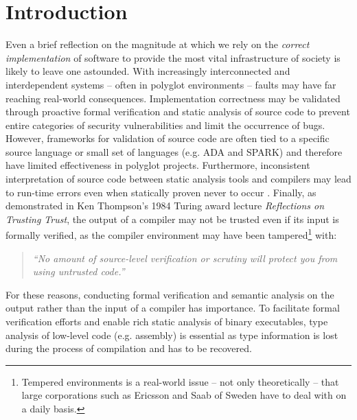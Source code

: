 
\section{Introduction}



Even a brief reflection on the magnitude at which we rely on the \textit{correct implementation} of software to provide the most vital infrastructure of society is likely to leave one astounded. With increasingly interconnected and interdependent systems -- often in polyglot environments -- faults may have far reaching real-world consequences. Implementation correctness may be validated through proactive formal verification and static analysis of source code to prevent entire categories of security vulnerabilities and limit the occurrence of bugs. However, frameworks for validation of source code are often tied to a specific source language or small set of languages (e.g. ADA and SPARK) and therefore have limited effectiveness in polyglot projects. Furthermore, inconsistent interpretation of source code between static analysis tools and compilers may lead to run-time errors even when statically proven never to occur \cite{ada_static_analysis_and_compiler_inconsistencies,wysinwyx}. Finally, as demonstrated in Ken Thompson's 1984 Turing award lecture \textit{Reflections on Trusting Trust}, the output of a compiler may not be trusted even if its input is formally verified, as the compiler environment may have been tampered\footnote{Tempered environments is a real-world issue -- not only theoretically -- that large corporations such as Ericsson and Saab of Sweden have to deal with on a daily basis.} with:

\begin{quote}
	\textit{``No amount of source-level verification or scrutiny will protect you from using untrusted code.''} \cite{trusting_trust}
\end{quote}

For these reasons, conducting formal verification and semantic analysis on the output rather than the input of a compiler has importance. To facilitate formal verification efforts and enable rich static analysis of binary executables, type analysis of low-level code (e.g. assembly) is essential as type information is lost during the process of compilation and has to be recovered.

